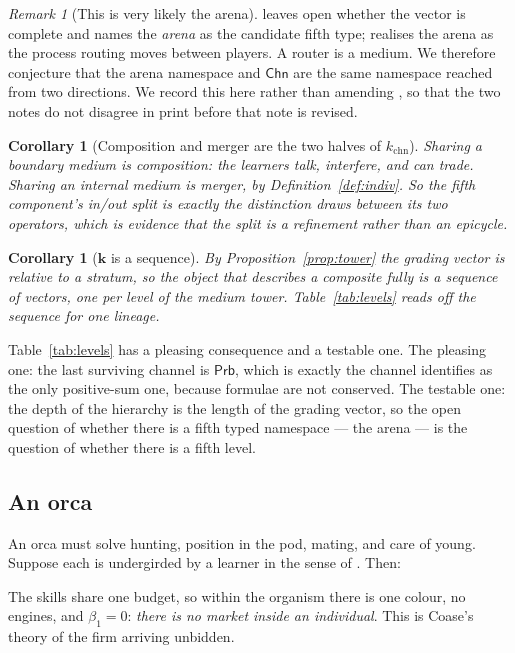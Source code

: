 \documentclass[11pt]{article}
\theoremstyle{plain}
\newtheorem{corollary}[theorem]{Corollary}
\theoremstyle{definition}
\theoremstyle{remark}
\newtheorem{remark}[theorem]{Remark}
\newcommand{\Prb}{\mathsf{Prb}}
\newcommand{\Chn}{\mathsf{Chn}}
\newcommand{\bt}{\beta_1}
\begin{document}
\begin{remark}[This is very likely the arena]
\cite{compose} leaves open whether the vector is complete and names the
\emph{arena} as the candidate fifth type; \cite{game} realises the arena
as the process routing moves between players. A router is a medium. We
therefore conjecture that the arena namespace and $\Chn$ are the same
namespace reached from two directions. We record this here rather than
amending \cite{compose}, so that the two notes do not disagree in print
before that note is revised.
\end{remark}

\begin{corollary}[Composition and merger are the two halves of
$k_{\mathrm{chn}}$]
Sharing a \emph{boundary} medium is composition: the learners talk,
interfere, and can trade. Sharing an \emph{internal} medium is merger, by
Definition~\ref{def:indiv}. So the fifth component's in/out split is
exactly the distinction \cite[\S8]{compose} draws between its two
operators, which is evidence that the split is a refinement rather than an
epicycle.
\end{corollary}

\begin{corollary}[$\mathbf{k}$ is a sequence]
By Proposition~\ref{prop:tower} the grading vector is relative to a
stratum, so the object that describes a composite fully is a sequence of
vectors, one per level of the medium tower. Table~\ref{tab:levels} reads
off the sequence for one lineage.
\end{corollary}

Table~\ref{tab:levels} has a pleasing consequence and a testable one. The
pleasing one: the last surviving channel is $\Prb$, which is exactly the
channel \cite[Obs.~6.1]{compose} identifies as the only positive-sum one,
because formulae are not conserved. The testable one: the depth of the
hierarchy is the length of the grading vector, so the open question of
whether there is a fifth typed namespace --- the arena --- is the question
of whether there is a fifth level.

\subsection{An orca}

An orca must solve hunting, position in the pod, mating, and care of young.
Suppose each is undergirded by a learner in the sense of \cite{compose}.
Then:

The skills share one budget, so within the organism there is one colour, no
engines, and $\bt = 0$: \emph{there is no market inside an individual}. This
is Coase's theory of the firm \cite{coase} arriving unbidden.
\end{document}
